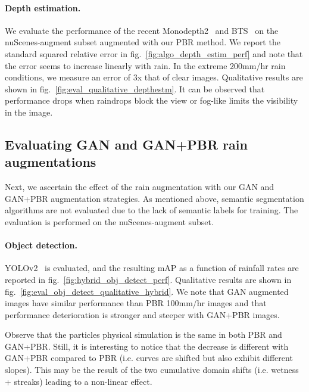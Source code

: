 \paragraph{Depth estimation.}
We evaluate the performance of the recent Monodepth2~\cite{godard2019digging} and BTS~\cite{lee2020big} on the nuScenes-augment subset augmented with our PBR method.
We report the standard squared relative error in fig.~\ref{fig:algo_depth_estim_perf} and note that the error seems to increase linearly with rain. In the extreme 200mm/hr rain conditions, we measure an error of 3x that of clear images.
Qualitative results are shown in fig.~\ref{fig:eval_qualitative_depthestm}. It can be observed that performance drops when raindrops block the view or fog-like limits the visibility in the image.

\subsection{Evaluating GAN and GAN+PBR rain augmentations}

Next, we ascertain the effect of the rain augmentation with our GAN and GAN+PBR augmentation strategies. As mentioned above, semantic segmentation algorithms are not evaluated due to the lack of semantic labels for training. The evaluation is performed on the nuScenes-augment subset. 

\paragraph{Object detection.}
YOLOv2~\cite{redmon2017yolo9000} is evaluated, and the resulting mAP as a function of rainfall rates are reported in fig.~\ref{fig:hybrid_obj_detect_perf}. Qualitative results are shown in fig.~\ref{fig:eval_obj_detect_qualitative_hybrid}. We note that GAN augmented images have similar performance than PBR 100mm/hr images and that performance deterioration is stronger and steeper with GAN+PBR images. 

Observe that the particles physical simulation is the same in both PBR and GAN+PBR. Still, it is interesting to notice that the decrease is different with GAN+PBR compared to PBR (i.e. curves are shifted but also exhibit different slopes). This may be the result of the two cumulative domain shifts (i.e. wetness + streaks) leading to a non-linear effect.

